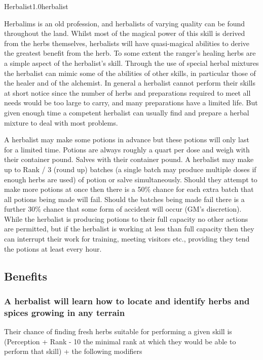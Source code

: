\begin{skill}{Herbalist}{1.0}{herbalist}

Herbalims is an old profession, and herbalists of varying quality can
be found throughout the land.  Whilst most of the magical power of
this skill is derived from the herbs themselves, herbalists will have
quasi-magical abilities to derive the greatest benefit from the herb.
To some extent the ranger's healing herbs are a simple aspect of the
herbalist's skill.  Through the use of special herbal mixtures the
herbalist can mimic some of the abilities of other skills, in
particular those of the healer and of the alchemist.  In general a
herbalist cannot perform their skills at short notice since the number
of herbs and preparations required to meet all needs would be too
large to carry, and many preparations have a limited life.  But given
enough time a competent herbalist can usually find and prepare a
herbal mixture to deal with most problems.

A herbalist may make some potions in advance but these potions will
only last for a limited time.  Potions are always roughly a quart per
dose and weigh with their container \textonehalf{} pound.  Salves with
their container \textonequarter{} pound.  A herbalist may make up to
Rank / 3 (round up) batches (a single batch may produce multiple doses
if enough herbs are used) of potion or salve simultaneously.  Should
they attempt to make more potions at once then there is a 50\% chance
for each extra batch that all potions being made will fail.  Should
the batches being made fail there is a further 30\% chance that some
form of accident will occur (GM's discretion).  While the herbalist is
producing potions to their full capacity no other actions are
permitted, but if the herbalist is working at less than full capacity
then they can interrupt their work for training, meeting visitors
etc., providing they tend the potions at least every hour.

\subsection{Benefits}

\subsubsection{A herbalist will learn how to locate and identify herbs
and spices growing in any terrain}

Their chance of finding fresh herbs suitable for performing a given
skill is (Perception  + Rank  - 10 \x the minimal rank at
which they would be able to perform that skill) + the following
modifiers


\end{skill}
